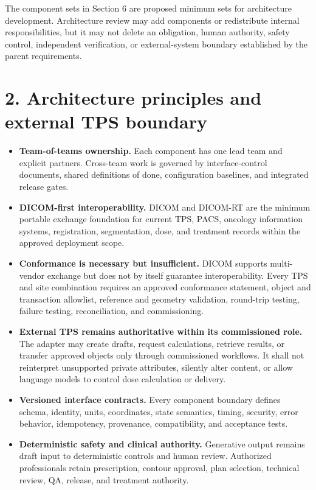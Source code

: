 \documentclass[11pt,letterpaper]{article}
\begin{document}
The component sets in Section 6 are proposed minimum sets for architecture development. Architecture review may add components or redistribute internal responsibilities, but it may not delete an obligation, human authority, safety control, independent verification, or external-system boundary established by the parent requirements.

\section{2. Architecture principles and external TPS boundary}
\begin{itemize}
\item \textbf{Team-of-teams ownership.} Each component has one lead team and explicit partners. Cross-team work is governed by interface-control documents, shared definitions of done, configuration baselines, and integrated release gates.
\item \textbf{DICOM-first interoperability.} DICOM and DICOM-RT are the minimum portable exchange foundation for current TPS, PACS, oncology information systems, registration, segmentation, dose, and treatment records within the approved deployment scope.
\item \textbf{Conformance is necessary but insufficient.} DICOM supports multi-vendor exchange but does not by itself guarantee interoperability. Every TPS and site combination requires an approved conformance statement, object and transaction allowlist, reference and geometry validation, round-trip testing, failure testing, reconciliation, and commissioning.
\item \textbf{External TPS remains authoritative within its commissioned role.} The adapter may create drafts, request calculations, retrieve results, or transfer approved objects only through commissioned workflows. It shall not reinterpret unsupported private attributes, silently alter content, or allow language models to control dose calculation or delivery.
\item \textbf{Versioned interface contracts.} Every component boundary defines schema, identity, units, coordinates, state semantics, timing, security, error behavior, idempotency, provenance, compatibility, and acceptance tests.
\item \textbf{Deterministic safety and clinical authority.} Generative output remains draft input to deterministic controls and human review. Authorized professionals retain prescription, contour approval, plan selection, technical review, QA, release, and treatment authority.
\end{itemize}
\end{document}
